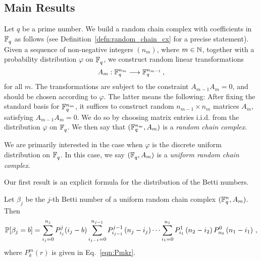 
\subsection*{Main Results}
Let $q$ be a prime number.  We
build a random chain complex with coefficients in $\mathbb{F}_q^{}$ as follows (see
Definition~\ref{defn:random_chain_cx} for a precise statement). Given a
sequence of non-negative integers $(n_m)$, where $m \in \mathbb{N}$, together with a probability
distribution $\varphi$ on $\mathbb{F}_q^{}$, we construct random
linear transformations 
\[
  A_m : \mathbb{F}_q^{n_m} \longrightarrow \mathbb{F}_q^{n_{m-1}} \, ,
\]
for all $m$. The transformations are subject to the constraint $A_{m-1} A_m =
0$, and should be chosen according to $\varphi$. The latter means the
following: After fixing the standard basis for $\mathbb{F}_q^{n_m}$, it suffices to
construct random $n_{m-1} \times n_m$ matrices $A_m$, satisfying $A_{m-1}A_m =
0$. We do so by choosing matrix entries i.i.d. from the distribution $\varphi$
on $\mathbb{F}_q^{}$. We then say that $(\mathbb{F}_q^{n_m}, A_m)$ is a {\em random chain complex}.  

We are primarily interested in the case when $\varphi$ is the discrete uniform distribution on $\mathbb{F}_q^{}$. In this case, we say
$(\mathbb{F}_q^{}, A_m)$ is a {\em uniform random chain complex}.


Our first result is an explicit formula for the distribution
of the Betti numbers.
\begin{bigthm} 
  \label{thm:bettinum}
  Let $\beta_j$ be the $j$-th Betti number of a uniform random chain complex
  $(\mathbb{F}_q^{n} , A_m)$. Then
  \[    
    \mathbb{P}[\beta_j = b] = \sum_{i_j=0}^{n_{j}} P_{i_j}^{j}(i_j-b)
    \sum_{i_{j-1}=0}^{n_{j-1}} P_{i_{j-1}}^{j-1}\left(n_{j} -i_j\right) \cdots
    \sum_{i_1 = 0}^{n_1} P_{i_1}^1\left(n_2 - i_2\right) P_{n_0}^0 \left(n_1 - i_1\right) \, ,
  \]
  where $P^m_k(r)$ is given in Eq.~\eqref{eqn:Pmkr}.
\end{bigthm}

